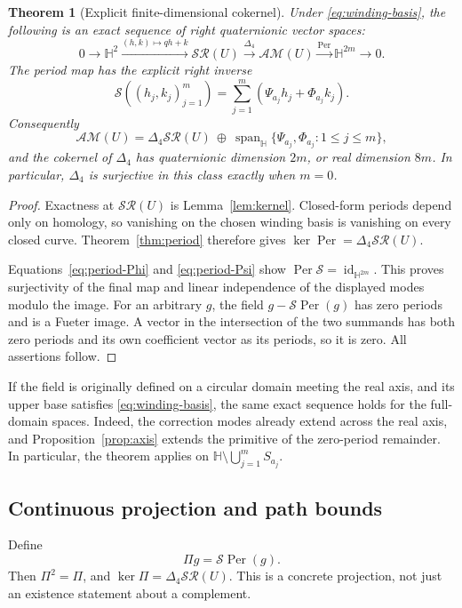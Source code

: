\documentclass[11pt,a4paper]{article}
\numberwithin{equation}{section}
\newtheorem{theorem}{Theorem}[section]
\theoremstyle{definition}
\theoremstyle{remark}
\newcommand{\HH}{\mathbb H}
\newcommand{\SR}{\mathcal{SR}}
\newcommand{\AM}{\mathcal{AM}}
\newcommand{\lap}{\Delta_4}
\newcommand{\Per}{\operatorname{Per}}
\begin{document}
\begin{theorem}[Explicit finite-dimensional cokernel]\label{thm:exact}
Under \eqref{eq:winding-basis}, the following is an exact sequence of
right quaternionic vector spaces:
\begin{equation}\label{eq:exact-sequence}
 0\longrightarrow\HH^2
 \xrightarrow{(h,k)\mapsto qh+k}\SR(U)
 \xrightarrow{\lap}\AM(U)
 \xrightarrow{\Per}\HH^{2m}\longrightarrow0.
\end{equation}
The period map has the explicit right inverse
\begin{equation}\label{eq:splitting}
 \mathcal S((h_j,k_j)_{j=1}^m)
       =\sum_{j=1}^m(\Psi_{a_j}h_j+\Phi_{a_j}k_j).
\end{equation}
Consequently
\begin{equation}\label{eq:direct-sum}
 \AM(U)=\lap\SR(U)\ \oplus\
   \operatorname{span}_{\HH}\{\Psi_{a_j},\Phi_{a_j}:1\le j\le m\},
\end{equation}
and the cokernel of $\lap$ has quaternionic dimension $2m$, or real
dimension $8m$. In particular, $\lap$ is surjective in this class exactly
when $m=0$.
\end{theorem}
\begin{proof}
Exactness at $\SR(U)$ is Lemma~\ref{lem:kernel}. Closed-form periods
depend only on homology, so vanishing on the chosen winding basis is
vanishing on every closed curve. Theorem~\ref{thm:period} therefore gives
$\ker\Per=\lap\SR(U)$.

Equations~\eqref{eq:period-Phi} and \eqref{eq:period-Psi} show
$\Per\mathcal S=\operatorname{id}_{\HH^{2m}}$. This proves surjectivity
of the final map and linear independence of the displayed modes modulo
the image. For an arbitrary $g$, the field
$g-\mathcal S\Per(g)$ has zero periods and is a Fueter image. A vector
in the intersection of the two summands has both zero periods and its
own coefficient vector as its periods, so it is zero. All assertions follow.
\end{proof}

If the field is originally defined on a circular domain meeting the real
axis, and its upper base satisfies \eqref{eq:winding-basis}, the same
exact sequence holds for the full-domain spaces. Indeed, the correction
modes already extend across the real axis, and
Proposition~\ref{prop:axis} extends the primitive of the zero-period
remainder. In particular, the theorem applies on
$\HH\setminus\bigcup_{j=1}^m S_{a_j}$.

\subsection{Continuous projection and path bounds}
Define
\begin{equation}\label{eq:projection}
 \Pi g=\mathcal S\Per(g).
\end{equation}
Then $\Pi^2=\Pi$, and $\ker\Pi=\lap\SR(U)$. This is a concrete
projection, not just an existence statement about a complement.
\end{document}
